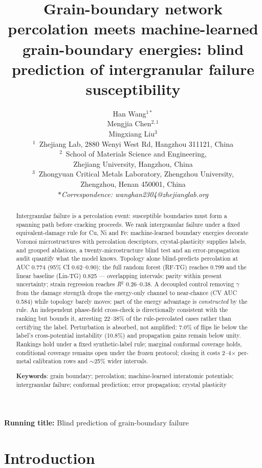 \documentclass[11pt]{article}
\title{Grain-boundary network percolation meets machine-learned grain-boundary energies: blind prediction of intergranular failure susceptibility}
\author{Han Wang$^{1*}$\\
Mengjia Chen$^{2,1}$\\
Mingxiang Liu$^{3}$\\
$^{1}$~Zhejiang Lab, 2880 Wenyi West Rd, Hangzhou 311121, China\\
$^{2}$~School of Materials Science and Engineering,\\ Zhejiang University, Hangzhou, China\\
$^{3}$~Zhongyuan Critical Metals Laboratory, Zhengzhou University,\\ Zhengzhou, Henan 450001, China\\
\textit{$*$Correspondence: wanghan2304@zhejianglab.org}}
\date{}
\begin{document}
\maketitle

\noindent\textbf{Running title:} Blind prediction of grain-boundary failure
\vspace{1em}

\begin{abstract}
Intergranular failure is a percolation event: susceptible boundaries must form a spanning path before cracking proceeds. We rank intergranular failure under a fixed equivalent-damage rule for Cu, Ni and Fe: machine-learned boundary energies decorate Voronoi microstructures with percolation descriptors, crystal-plasticity supplies labels, and grouped ablations, a twenty-microstructure blind test and an error-propagation audit quantify what the model knows. Topology alone blind-predicts percolation at AUC 0.774 (95\% CI 0.62--0.90); the full random forest (RF-TG) reaches 0.799 and the linear baseline (Lin-TG) 0.825 --- overlapping intervals: parity within present uncertainty; strain regression reaches \textit{R}$^{2}$ 0.26--0.38. A decoupled control removing $\gamma$ from the damage strength drops the energy-only channel to near-chance (CV AUC 0.584) while topology barely moves: part of the energy advantage is \textit{constructed} by the rule. An independent phase-field cross-check is directionally consistent with the ranking but bounds it, arresting 22--38\% of the rule-percolated cases rather than certifying the label. Perturbation is absorbed, not amplified: 7.0\% of flips lie below the label's cross-potential instability (10.8\%) and propagation gains remain below unity. Rankings hold under a fixed synthetic-label rule; marginal conformal coverage holds, conditional coverage remains open under the frozen protocol; closing it costs 2--4$\times$ per-metal calibration rows and $\sim$25\% wider intervals.

\vspace{0.6em}
\noindent\textbf{Keywords}: grain boundary; percolation; machine-learned interatomic potentials; intergranular failure; conformal prediction; error propagation; crystal plasticity
\end{abstract}

\section{Introduction}
\end{document}
